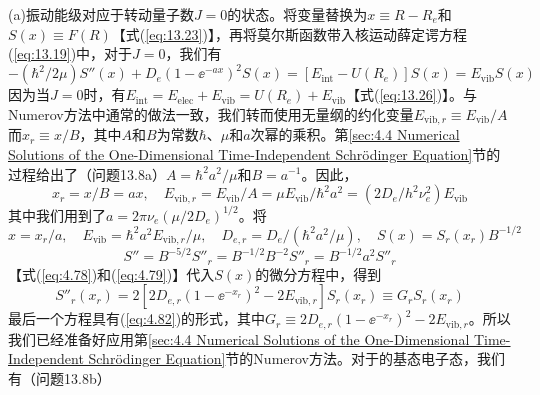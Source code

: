 \begin{examplebox}
        (a)振动能级对应于转动量子数$J=0$的状态。将变量替换为$x \equiv R - R_e$和$S\left(x\right) \equiv F\left(R\right)$【式(\ref{eq:13.23})】，再将莫尔斯函数带入核运动薛定谔方程(\ref{eq:13.19})中，对于$J=0$，我们有
        \begin{equation*}
            -\left(\hbar^2/2\mu\right)S''\left(x\right) + D_e\left(1-\ee ^{-ax}\right)^2S\left(x\right) = \left[E_{\text{int}} - U\left(R_e\right)\right]S\left(x\right) = E_{\text{vib}}S\left(x\right)
        \end{equation*}
        因为当$J=0$时，有$E_{\text{int}} = E_{\text{elec}} + E_{\text{vib}} = U\left(R_e\right) + E_{\text{vib}}$【式(\ref{eq:13.26})】。与Numerov方法中通常的做法一致，我们转而使用无量纲的约化变量$E_{\text{vib},r} \equiv E_{\text{vib}}/A$而$x_r \equiv x /B$，其中$A$和$B$为常数$\hbar$、$\mu$和$a$次幂的乘积。第\ref{sec:4.4 Numerical Solutions of the One-Dimensional Time-Independent Schrödinger Equation}节的过程给出了（问题13.8a）$A = \hbar^2a^2/\mu$和$B = a^{-1}$。因此，
        \begin{equation*}
            x_r = x/B = ax, \quad E_{\text{vib},r} = E_{\text{vib}}/A = \mu E_{\text{vib}}/\hbar^2a^2 = \left(2D_e/h^2\nu_e^2\right)E_{\text{vib}}
        \end{equation*}
        其中我们用到了$a = 2\pi\nu_e\left(\mu/2D_e\right)^{1/2}$。将
        \begin{equation*}
            x = x_{r}/a, \quad E_{\text{vib}} = \hbar^{2}a^{2} E_{\text{vib},r}/\mu, \quad D_{e,r} = D_{e}/\left(\hbar^{2}a^{2}/\mu\right), \quad S\left(x\right) = S_{r}\left(x_{r}\right)B^{-1/2}
        \end{equation*}
        \begin{equation*}
            S'' = B^{-5/2}S''_r = B^{-1/2}B^{-2}S''_r = B^{-1/2}a^2 S''_r
        \end{equation*}
        【式(\ref{eq:4.78})和(\ref{eq:4.79})】代入$S\left(x\right)$的微分方程中，得到
        \begin{equation*}
            S''_r\left(x_r\right) = 2\left[2D_{e,r}\left(1-\ee ^{-x_r}\right)^2 - 2E_{\text{vib},r}\right]S_r\left(x_r\right) \equiv G_rS_r\left(x_r\right)
        \end{equation*}
        最后一个方程具有(\ref{eq:4.82})的形式，其中$G_r \equiv 2D_{e,r}\left(1-\ee ^{-x_r}\right)^2 - 2E_{\text{vib},r}$。所以我们已经准备好应用第\ref{sec:4.4 Numerical Solutions of the One-Dimensional Time-Independent Schrödinger Equation}节的Numerov方法。对于的基态电子态，我们有（问题13.8b）
        \begin{equation*}

\end{equation*}
\end{examplebox}

